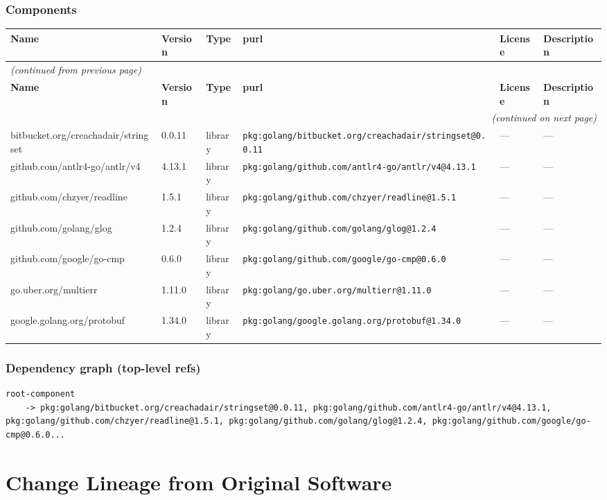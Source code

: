 \documentclass[11pt,a4paper]{article}
\begin{document}
\subsubsection*{Components}
\begin{longtable}{|p{4cm}|p{2cm}|p{1.6cm}|p{5cm}|p{1.5cm}|p{3.5cm}|}
\toprule
\rowcolor{sbomhdr}\textbf{Name} & \textbf{Version} & \textbf{Type} & \textbf{purl} & \textbf{License} & \textbf{Description} \\
\midrule
\endfirsthead
\multicolumn{6}{l}{\small\itshape (continued from previous page)} \\
\toprule
\rowcolor{sbomhdr}\textbf{Name} & \textbf{Version} & \textbf{Type} & \textbf{purl} & \textbf{License} & \textbf{Description} \\
\midrule
\endhead
\midrule
\multicolumn{6}{r}{\small\itshape (continued on next page)} \\
\endfoot
\bottomrule
\endlastfoot
\raggedright bitbucket.org/creachadair/stringset & 0.0.11 & library & \small\texttt{pkg:golang/bitbucket.org/creachadair/stringset@0.0.11} & — & \small — \\
\raggedright github.com/antlr4-go/antlr/v4 & 4.13.1 & library & \small\texttt{pkg:golang/github.com/antlr4-go/antlr/v4@4.13.1} & — & \small — \\
\raggedright github.com/chzyer/readline & 1.5.1 & library & \small\texttt{pkg:golang/github.com/chzyer/readline@1.5.1} & — & \small — \\
\raggedright github.com/golang/glog & 1.2.4 & library & \small\texttt{pkg:golang/github.com/golang/glog@1.2.4} & — & \small — \\
\raggedright github.com/google/go-cmp & 0.6.0 & library & \small\texttt{pkg:golang/github.com/google/go-cmp@0.6.0} & — & \small — \\
\raggedright go.uber.org/multierr & 1.11.0 & library & \small\texttt{pkg:golang/go.uber.org/multierr@1.11.0} & — & \small — \\
\raggedright google.golang.org/protobuf & 1.34.0 & library & \small\texttt{pkg:golang/google.golang.org/protobuf@1.34.0} & — & \small — \\
\end{longtable}

\subsubsection*{Dependency graph (top-level refs)}
\begin{lstlisting}[style=depgraph]
  root-component
    -> pkg:golang/bitbucket.org/creachadair/stringset@0.0.11, pkg:golang/github.com/antlr4-go/antlr/v4@4.13.1, pkg:golang/github.com/chzyer/readline@1.5.1, pkg:golang/github.com/golang/glog@1.2.4, pkg:golang/github.com/google/go-cmp@0.6.0...
\end{lstlisting}

\newpage
\section{Change Lineage from Original Software}
\end{document}
